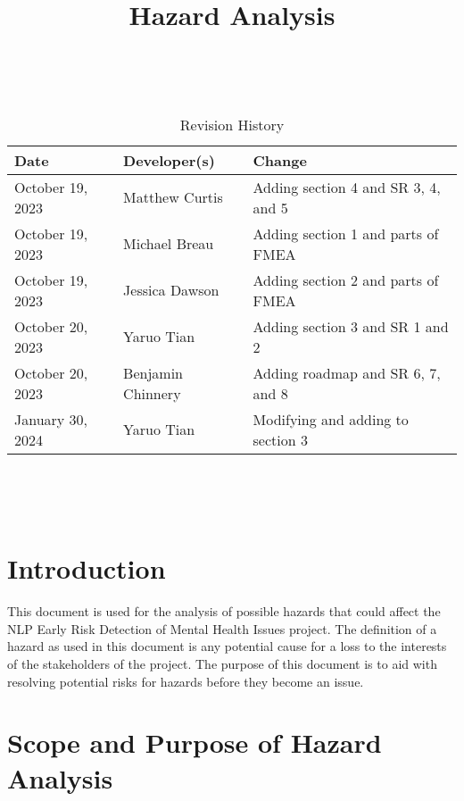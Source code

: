 \documentclass{article}
\title{Hazard Analysis\\\progname}
\author{\authname}
\date{}
\begin{document}
\maketitle
\thispagestyle{empty}

~\newpage



\begin{table}[hp]
\caption{Revision History} \label{TblRevisionHistory}
\begin{tabularx}{\textwidth}{llX}
\toprule
\textbf{Date} & \textbf{Developer(s)} & \textbf{Change}\\
\midrule
October 19, 2023 & Matthew Curtis & Adding section 4 and SR 3, 4, and 5\\
October 19, 2023 & Michael Breau & Adding section 1 and parts of FMEA\\
October 19, 2023 & Jessica Dawson & Adding section 2 and parts of FMEA\\
October 20, 2023 & Yaruo Tian & Adding section 3 and SR 1 and 2\\
October 20, 2023 & Benjamin Chinnery & Adding roadmap and SR 6, 7, and 8\\
January 30, 2024 & Yaruo Tian & Modifying and adding to section 3 \\
\bottomrule
\end{tabularx}
\end{table}

~\newpage

\tableofcontents

~\newpage


\section{Introduction}

This document is used for the analysis of possible hazards that could affect the NLP Early Risk Detection of Mental Health Issues project. The definition of a hazard as used in this document is any potential cause for a loss to the interests of the stakeholders of the project. The purpose of this document is to aid with resolving potential risks for hazards before they become an issue.

\section{Scope and Purpose of Hazard Analysis}
\end{document}
